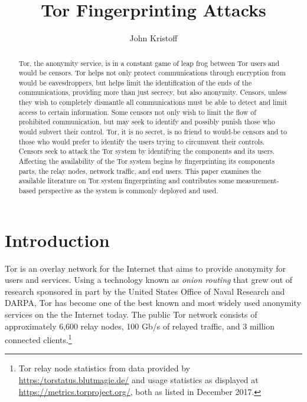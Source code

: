 \documentclass[sigconf]{acmart}
\begin{document}
\title{Tor Fingerprinting Attacks}
\author{John Kristoff}

\begin{abstract}

Tor, the anonymity service, is in a constant game of leap frog between
Tor users and would be censors.  Tor helps not only protect
communications through encryption from would be eavesdroppers, but helps
limit the identification of the ends of the communications, providing
more than just secrecy, but also anonymity.  Censors, unless they wish
to completely dismantle all communications must be able to detect and
limit access to certain information.  Some censors not only wish to
limit the flow of prohibited communication, but may seek to identify and
possibly punish those who would subvert their control.  Tor, it is no
secret, is no friend to would-be censors and to those who would prefer
to identify the users trying to circumvent their controls.  Censors seek
to attack the Tor system by identifying the components and its users.
Affecting the availability of the Tor system begins by fingerprinting
its components parts, the relay nodes, network traffic, and end users.
This paper examines the available literature on Tor system
fingerprinting and contributes some measurement-based perspective as the
system is commonly deployed and used.

\end{abstract}

\maketitle

\section{Introduction}

Tor is an overlay network for the Internet that aims to provide
anonymity for users and services.\cite{dingledine_tor:_2004}  Using a
technology known as \emph{onion routing} that grew out of research
sponsored in part by the United States Office of Naval Research and
DARPA, Tor has become one of the best known and most widely used
anonymity services on the the Internet today.  The public Tor network
consists of approximately 6,600 relay nodes, 100 Gb/s of relayed
traffic, and 3 million connected clients.\footnote{Tor relay node
statistics from data provided by \url{https:/torstatus.blutmagie.de/}
and usage statistics as displayed at
\url{https://metrics.torproject.org/}, both as listed in December 2017.}
\end{document}
